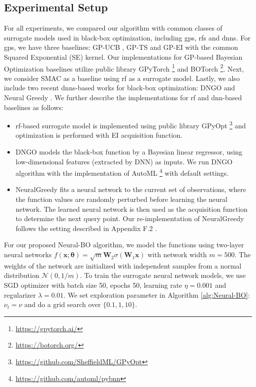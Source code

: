 \subsection{Experimental Setup}
For all experiments, we compared our algorithm with common classes of surrogate models used in black-box optimization, including \acp{gp}, \acp{rf} and \acp{dnn}. For \acp{gp}, we have three baselines: GP-UCB \citep{srinivas2009gaussian}, GP-TS \citep{chowdhury2017kernelized} and GP-EI \citep{jones1998efficient} with the common Squared Exponential (SE) kernel. Our implementations for GP-based Bayesian Optimization baselines utilize public library GPyTorch  \footnote{\url{https://gpytorch.ai/}} and BOTorch \footnote{\url{https://botorch.org/}}. Next, we consider SMAC \citep{hutter2011sequential} as a baseline using \ac{rf} as a surrogate model. Lastly, we also include two recent \acp{dnn}-based works for black-box optimization: DNGO \citep{snoek2015scalable} and Neural Greedy \citep{pariagreedy}. We further describe the implementations for \ac{rf} and \ac{dnn}-based baselines as follows: 
\begin{itemize}
    \item \ac{rf}-based surrogate model is implemented using public library GPyOpt \footnote{\url{https://github.com/SheffieldML/GPyOpt}} and optimization is performed with EI acquisition function.
    \item DNGO \citep{snoek2015scalable} models the black-box function by a Bayesian linear regressor, using low-dimensional features (extracted by DNN) as inputs. We run DNGO algorithm with the implementation of AutoML \footnote{\url{https://github.com/automl/pybnn}} with default settings. 
    \item NeuralGreedy \citep{pariagreedy} fits a neural network to the current set of observations, where the function values are randomly perturbed before learning the neural network. The learned neural network is then used as the acquisition function to determine the next query point. Our re-implementation of NeuralGreedy follows the setting described in Appendix F.2 \citep{pariagreedy}.  
\end{itemize}
 

For our proposed Neural-BO algorithm, we model the functions using two-layer neural networks $f(\mathbf{x}; \boldsymbol{\theta}) = \sqrt{m}\mathbf{W}_2\sigma(\mathbf{W}_1\mathbf{x})$ with network width $m=500$. 
The weights of the network are initialized with independent samples from a normal distribution $\mathcal{N} (0, 1/m)$. To train the surrogate neural network models, we use SGD optimizer with batch size 50, epochs 50, learning rate $\eta=0.001$ and regularizer $\lambda=0.01$. We set exploration parameter in Algorithm \ref{alg:Neural-BO}: $\nu_t = \nu$ and do a grid search over $\{0.1,1,10\}$. 

